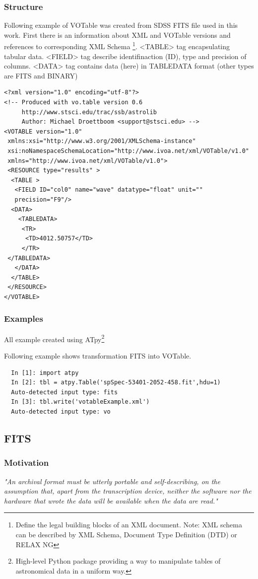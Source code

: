 \subsubsection*{Structure}
Following example of VOTable was created from SDSS FITS file used in
this work. First there is an information about XML and VOTable
versions and references to corresponding XML Schema \footnote{Define
  the legal building blocks of an XML document. Note: XML schema can
  be described by XML Schema, Document Type Definition (DTD) or RELAX
  NG }. <TABLE> tag encapsulating tabular data. <FIELD>
tag describe identifinaction (ID), type and precision of
columns. <DATA> tag contains data (here) in TABLEDATA format (other
types are FITS and BINARY)
 
\begin{lstlisting}
<?xml version="1.0" encoding="utf-8"?>
<!-- Produced with vo.table version 0.6
     http://www.stsci.edu/trac/ssb/astrolib
     Author: Michael Droettboom <support@stsci.edu> -->
<VOTABLE version="1.0"
 xmlns:xsi="http://www.w3.org/2001/XMLSchema-instance"
 xsi:noNamespaceSchemaLocation="http://www.ivoa.net/xml/VOTable/v1.0"
 xmlns="http://www.ivoa.net/xml/VOTable/v1.0">
 <RESOURCE type="results" >
  <TABLE >
   <FIELD ID="col0" name="wave" datatype="float" unit=""
   precision="F9"/>
  <DATA>
    <TABLEDATA>
     <TR>
      <TD>4012.50757</TD>
     </TR>
 </TABLEDATA>
   </DATA>
  </TABLE>
 </RESOURCE>
</VOTABLE>
\end{lstlisting}


\subsubsection*{Examples}
All example created using ATpy\footnote{High-level Python package
providing a way to manipulate tables of astronomical data in a uniform
way.}

Following example shows transformation FITS into VOTable. 
\begin{lstlisting}
  In [1]: import atpy
  In [2]: tbl = atpy.Table('spSpec-53401-2052-458.fit',hdu=1)
  Auto-detected input type: fits
  In [3]: tbl.write('votableExample.xml')
  Auto-detected input type: vo
\end{lstlisting}

\subsection{FITS}
\subsubsection*{Motivation}
\emph{
"An archival format must be utterly portable and self-describing, on
the assumption that, apart from the transcription device, neither the
software nor the hardware that wrote the data will be available when
the data are read." \cite{nrc1995}}


